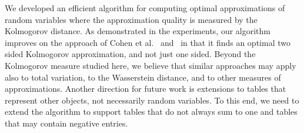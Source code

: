 \documentclass[letterpaper]{article} %
\begin{document}
We developed an efficient algorithm for computing optimal approximations of random variables where the approximation quality is measured by the Kolmogorov distance.
As demonstrated in the experiments, our algorithm improves on the approach of Cohen et al.~ and~ in that it finds an optimal two sided Kolmogorov approximation, and not just one sided. Beyond the Kolmogorov measure studied here, we believe that similar approaches may apply also to total variation, to the Wasserstein distance, and to other measures of approximations. Another direction for future work is extensions to tables that represent other objects, not necessarily random variables. To this end, we need to extend the algorithm to support tables that do not always sum to one and tables that may contain negative entries.



\end{document}
